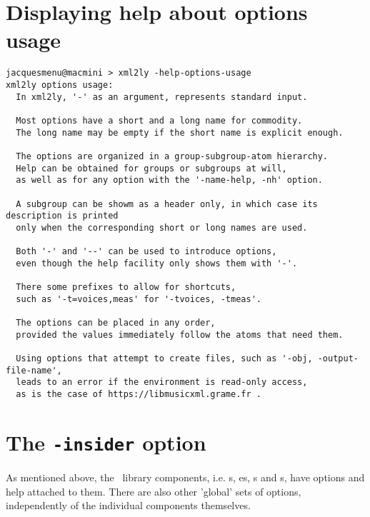 \section{Displaying help about options usage}

\begin{lstlisting}[language=Terminal]
jacquesmenu@macmini > xml2ly -help-options-usage
xml2ly options usage:
  In xml2ly, '-' as an argument, represents standard input.

  Most options have a short and a long name for commodity.
  The long name may be empty if the short name is explicit enough.

  The options are organized in a group-subgroup-atom hierarchy.
  Help can be obtained for groups or subgroups at will,
  as well as for any option with the '-name-help, -nh' option.

  A subgroup can be showm as a header only, in which case its description is printed
  only when the corresponding short or long names are used.

  Both '-' and '--' can be used to introduce options,
  even though the help facility only shows them with '-'.

  There some prefixes to allow for shortcuts,
  such as '-t=voices,meas' for '-tvoices, -tmeas'.

  The options can be placed in any order,
  provided the values immediately follow the atoms that need them.

  Using options that attempt to create files, such as '-obj, -output-file-name',
  leads to an error if the environment is read-only access,
  as is the case of https://libmusicxml.grame.fr .
\end{lstlisting}


\section{The {\tt -insider} option}

As mentioned above, the \mf\ library components, i.e. \representation s, \pass es, \converter s and \generator s, have options and help attached to them. There are also other 'global' sets of options, independently of the individual components themselves.

